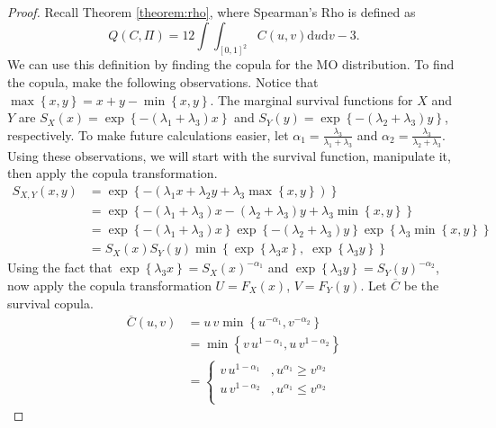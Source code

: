 \begin{proof}
    Recall Theorem \ref{theorem:rho}, where Spearman's Rho is defined as $$Q\left(C,\Pi\right)=12\int\int_{[0,1]^2}C\left(u,v\right)\mathrm{d}u\mathrm{d}v-3.$$ We can use this definition by finding the copula for the MO distribution. To find the copula, make the following observations. Notice that $\max\left\{x,y\right\}=x+y-\min\left\{x,y\right\}$. The marginal survival functions for $X$ and $Y$ are $S_X\left(x\right)=\exp\left\{-\left(\lambda_1+\lambda_3\right)x\right\}$ and $S_Y\left(y\right)=\exp\left\{-\left(\lambda_2+\lambda_3\right)y\right\}$, respectively. To make future calculations easier, let $\alpha_1=\frac{\lambda_3}{\lambda_1+\lambda_3}$ and $\alpha_2=\frac{\lambda_3}{\lambda_2+\lambda_3}$. Using these observations, we will start with the survival function, manipulate it, then apply the copula transformation.
    \begin{align*}
        S_{X,Y}\left(x,y\right)&=\exp\left\{-\left(\lambda_1x+\lambda_2y+\lambda_3\max\left\{x,y\right\}\right)\right\}\\
        &=\exp\left\{-\left(\lambda_1+\lambda_3\right)x-\left(\lambda_2+\lambda_3\right)y+\lambda_3\min\left\{x,y\right\}\right\}\\
        &=\exp\left\{-\left(\lambda_1+\lambda_3\right) x\right\}\exp\left\{-\left(\lambda_2+\lambda_3\right)y\right\}\exp\left\{\lambda_3\min\left\{x,y\right\}\right\}\\
        &=S_X\left(x\right)S_Y\left(y\right)\min\left\{\exp\left\{\lambda_3x\right\},\;\exp\left\{\lambda_3y\right\}\right\}
    \end{align*}
    Using the fact that $\exp\left\{\lambda_3x\right\}=S_X\left(x\right)^{-\alpha_1}$ and $\exp\left\{\lambda_3y\right\}=S_Y\left(y\right)^{-\alpha_2}$, now apply the copula transformation $U=F_X\left(x\right)$, $V=F_Y\left(y\right)$. Let $\overline{C}$ be the survival copula.
    \begin{align*}
        \overline{C}\left(u,v\right)&=u\, v\min\left\{u^{-\alpha_1},v^{-\alpha_2}\right\}\\
        &=\min\left\{v\, u^{1-\alpha_1},u\, v^{1-\alpha_2}\right\}\\
        &=\begin{cases}v\, u^{1-\alpha_1} & ,u^{\alpha_1}\geq v^{\alpha_2}\\ u\, v^{1-\alpha_2} & ,u^{\alpha_1}\leq v^{\alpha_2}\\ \end{cases}
    \end{align*}

\end{proof}

